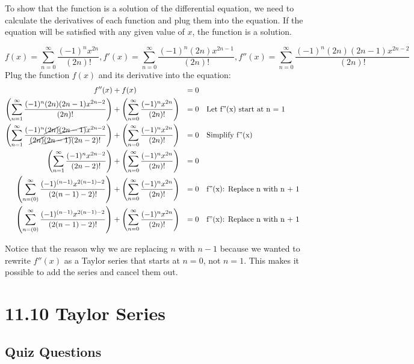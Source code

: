 \documentclass[12pt]{article}
\begin{document}
\begin{solution}
To show that the function is a solution of the differential equation, we need to calculate the derivatives of each function and plug them into the equation. If the equation will be satisfied with any given value of $x$, the function is a solution.

$$f(x) = \sum_{n=0}^{\infty} \frac{(-1)^nx^{2n}}{(2n)!}, f'(x) = \sum_{n=0}^{\infty} \frac{(-1)^n (2n)x^{2n - 1}}{(2n)!}, f''(x) = \sum_{n=0}^{\infty} \frac{(-1)^n (2n)(2n - 1)x^{2n - 2}}{(2n)!}$$
Plug the function $f(x)$ and its derivative into the equation:
\begin{align*}
f''(x) &+ f(x) &= 0 \\
\left(\sum_{n=1}^{\infty} \frac{(-1)^n (2n)(2n - 1)x^{2n - 2}}{(2n)!}\right) &+ \left(\sum_{n=0}^{\infty} \frac{(-1)^nx^{2n}}{(2n)!}\right) &= 0 & \quad \text{Let f''(x) start at n = 1} \\
\left(\sum_{n=1}^{\infty} \frac{(-1)^n \cancel{(2n)}\cancel{(2n - 1)}x^{2n - 2}}{\cancel{(2n)}\cancel{(2n - 1)}(2n - 2)!}\right) &+ \left(\sum_{n=0}^{\infty} \frac{(-1)^nx^{2n}}{(2n)!}\right) &= 0 & \quad \text{Simplify f''(x)} \\
\left(\sum_{n=1}^{\infty} \frac{(-1)^n x^{2n - 2}}{(2n - 2)!}\right) &+ \left(\sum_{n=0}^{\infty} \frac{(-1)^nx^{2n}}{(2n)!}\right) &= 0 & \quad \text{} \\
\left(\sum_{n=(0)}^{\infty} \frac{(-1)^{(n- 1)} x^{2(n - 1) - 2}}{(2(n - 1) - 2)!}\right) &+ \left(\sum_{n=0}^{\infty} \frac{(-1)^nx^{2n}}{(2n)!}\right) &= 0 & \quad \text{f''(x): Replace n with n + 1} \\
\left(\sum_{n=(0)}^{\infty} \frac{(-1)^{(n- 1)} x^{2(n - 1) - 2}}{(2(n - 1) - 2)!}\right) &+ \left(\sum_{n=0}^{\infty} \frac{(-1)^nx^{2n}}{(2n)!}\right) &= 0 & \quad \text{f''(x): Replace n with n + 1} \\
\end{align*}

Notice that the reason why we are replacing $n$ with $n - 1$ because we wanted to rewrite $f''(x)$ as a Taylor series that starts at $n = 0$, not $n = 1$. This makes it possible to add the series and cancel them out.
\end{solution}

\section*{11.10 Taylor Series}
\subsection*{Quiz Questions}
\end{document}
